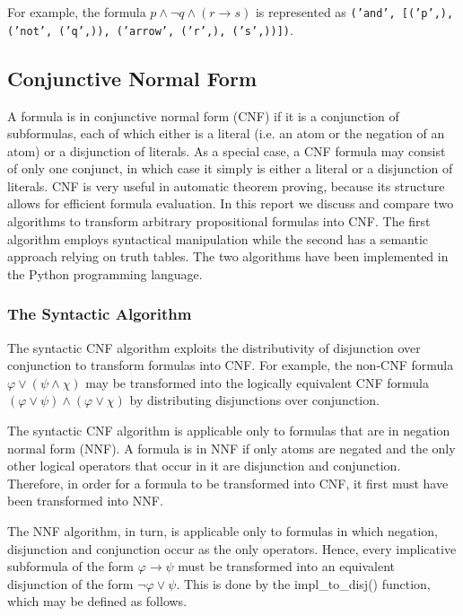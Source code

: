 \documentclass[a4paper,notitlepage]{scrartcl}
\let\phi\varphi
\begin{document}
\noindent
For example, the formula $p \land \lnot q \land (r \to s)$ is represented as
\texttt{('and', [('p',), ('not', ('q',)), ('arrow', ('r',), ('s',))])}.


\subsection{Conjunctive Normal Form}

A formula is in conjunctive normal form (CNF) if it is a conjunction of
subformulas, each of which either is a literal (i.e. an atom or the negation of
an atom) or a disjunction of literals.
As a special case, a CNF formula may consist of only one conjunct, in which
case it simply is either a literal or a disjunction of literals. 
CNF is very useful in automatic theorem proving, because its structure allows
for efficient formula evaluation.
In this report we discuss and compare two algorithms to transform arbitrary
propositional formulas into CNF.
The first algorithm employs syntactical manipulation while the second has a
semantic approach relying on truth tables.
The two algorithms have been implemented in the Python programming language.

\subsubsection{The Syntactic Algorithm}

The syntactic CNF algorithm exploits the distributivity of disjunction over
conjunction to transform formulas into CNF.
For example, the non-CNF formula $\phi \lor (\psi \land \chi)$ may be
transformed into the logically equivalent CNF formula $(\phi \lor \psi) \land
(\phi \lor \chi)$ by distributing disjunctions over conjunction.

The syntactic CNF algorithm is applicable only to formulas that are in negation
normal form (NNF).
A formula is in NNF if only atoms are negated and the only other logical
operators that occur in it are disjunction and conjunction.
Therefore, in order for a formula to be transformed into CNF, it first must
have been transformed into NNF.

The NNF algorithm, in turn, is applicable only to formulas in which negation,
disjunction and conjunction occur as the only operators.
Hence, every implicative subformula of the form $\phi \to \psi$ must be
transformed into an equivalent disjunction of the form $\lnot\phi \lor \psi$.
This is done by the impl\_to\_disj() function, which may be defined as follows.
\end{document}
